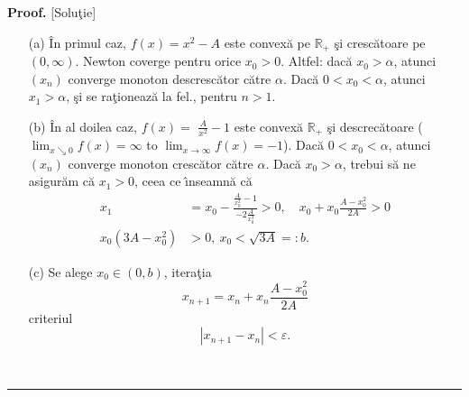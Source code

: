 \documentclass[12pt]{article}%
\newenvironment{proof}[1][Proof]{\noindent\textbf{#1.} }{\ \rule{0.5em}{0.5em}}
\begin{document}
\begin{proof}
[Solu\c{t}ie]

\begin{enumerate}
\item[(a)] \^{I}n primul caz,  $f(x)=x^{2}-A$ este convex\u{a} pe
$\mathbb{R}_{+}$ \c{s}i cresc\u{a}toare pe $(0,\infty)$. Newton coverge pentru
orice $x_{0}>0$. Altfel: dac\u{a} $x_{0}>\alpha$, atunci $\left(
x_{n}\right)  $ converge monoton descresc\u{a}tor c\u{a}tre $\alpha$. Dac\u{a}
$0<x_{0}<\alpha$, atunci $x_{1}>\alpha$, \c{s}i se ra\c{t}ioneaz\u{a} la fel.,
pentru $n>1$. 

\item[(b)] \^{I}n al doilea caz, $f(x)=$ $\frac{A}{x^{2}}-1$ este convex\u{a}
$\mathbb{R}_{+}$ \c{s}i descrec\u{a}toare ($\lim_{x\searrow0}f(x)=\infty$ to
$\lim_{x\rightarrow\infty}f(x)=-1$). Dac\u{a} $0<x_{0}<\alpha$, atunci
$\left(  x_{n}\right)  $ converge  monoton cresc\u{a}tor c\u{a}tre $\alpha$.
Dac\u{a} $x_{0}>\alpha$, trebui s\u{a} ne asigur\u{a}m c\u{a} $x_{1}>0$, ceea
ce \^{\i}nseamn\u{a} c\u{a}
\begin{align*}
x_{1} &  =x_{0}-\frac{\frac{A}{x_{0}^{2}}-1}{-2\frac{A}{x_{0}^{3}}}>0,\quad
x_{0}+x_{0}\frac{A-x_{0}^{2}}{2A}>0\\
x_{0}\left(  3A-x_{0}^{2}\right)   &  >0,~x_{0}<\sqrt{3A}=:b.
\end{align*}


\item[(c)] Se alege $x_{0}\in(0,b)$, itera\c{t}ia
\[
x_{n+1}=x_{n}+x_{n}\frac{A-x_{0}^{2}}{2A}%
\]
criteriul%
\[
|x_{n+1}-x_{n}|<\varepsilon.
\]

\end{enumerate}
\end{proof}
\end{document}
